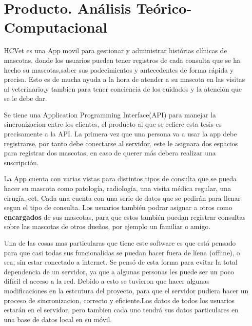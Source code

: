 \chapter{Producto. Análisis Teórico-Computacional}\label{chapter:proposal}

HCVet es una App movil para gestionar y administrar histórias clínicas de mascotas, donde los usuarios pueden tener registros de cada consulta que se ha hecho su mascotas,saber sus padecimientos y antecedentes de forma rápida y precisa. Esto es de mucha ayuda a la hora de atender a su mascota en las visitas al veterinario,y tambien para tener conciencia de los cuidados y la atención que se le debe dar.

Se tiene una Application Programming Interface(API) para manejar la sincronizacion entre los clientes, el producto al que se refiere esta tesis es precisamente a la API. La primera vez que una persona va a usar la app debe registrarse, por tanto debe conectarse al servidor, este le asignara dos espacios para registrar dos mascotas, en caso de querer más debera realizar una suscripción.

La App cuenta con varias vistas para distintos tipos de consulta que se pueda hacer su mascota como patología, radiología, una visita médica regular, una cirugía, ect. Cada una cuenta con una serie de datos que se pedirán para llenar segun el tipo de consulta. Los usuarios también podrar asignar a otros como \textbf{encargados} de sus mascotas, para que estos también puedan registrar consultas sobre  las mascotas de otros dueños, por ejemplo un familiar o amigo.

Una de las cosas mas particularas que tiene este software es que está pensado para que casi todas sus funcionalidas se puedan hacer fuera de líena (offline), o sea, sin estar conectado a internet. Se pensó de esta forma para evitar la total dependencia de un servidor, ya que a algunas personas les puede ser un poco difícil el acceso a la red. Debido a esto se tuvieron que hacer algunas modificaciones en la estcutura del proyecto, para que el servidor pudiera hacer un proceso de sincronizacion, correcto y eficiente.Los datos de todos los usuarios estarán en el servidor, pero tambien cada uno tendrá sus datos particulares en una base de datos local en su móvil. 


